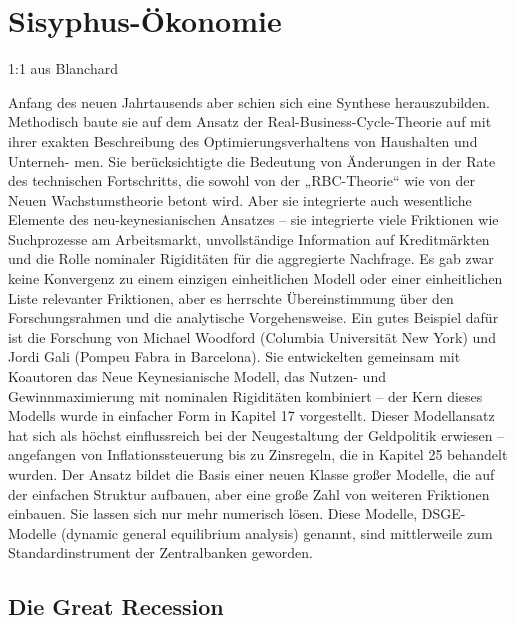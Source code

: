 %
%
%

\chapter{Sisyphus-Ökonomie}

1:1 aus Blanchard

Anfang des neuen Jahrtausends aber schien sich eine Synthese herauszubilden.
Methodisch baute sie auf dem Ansatz der Real-Business-Cycle-Theorie auf mit ihrer
exakten Beschreibung des Optimierungsverhaltens von Haushalten und Unterneh-
men. Sie berücksichtigte die Bedeutung von Änderungen in der Rate des technischen
Fortschritts, die sowohl von der „RBC-Theorie“ wie von der Neuen Wachstumstheorie
betont wird. Aber sie integrierte auch wesentliche Elemente des neu-keynesianischen
Ansatzes – sie integrierte viele Friktionen wie Suchprozesse am Arbeitsmarkt, unvollständige
Information auf Kreditmärkten und die Rolle nominaler Rigiditäten für die
aggregierte Nachfrage. Es gab zwar keine Konvergenz zu einem einzigen einheitlichen
Modell oder einer einheitlichen Liste relevanter Friktionen, aber es herrschte Übereinstimmung
über den Forschungsrahmen und die analytische Vorgehensweise.
Ein gutes Beispiel dafür ist die Forschung von Michael Woodford (Columbia Universität
New York) und Jordi Gali (Pompeu Fabra in Barcelona). Sie entwickelten gemeinsam
mit Koautoren das Neue Keynesianische Modell, das Nutzen- und Gewinnmaximierung
mit nominalen Rigiditäten kombiniert – der Kern dieses Modells wurde in
einfacher Form in Kapitel 17 vorgestellt. Dieser Modellansatz hat sich als höchst einflussreich
bei der Neugestaltung der Geldpolitik erwiesen – angefangen von Inflationssteuerung
bis zu Zinsregeln, die in Kapitel 25 behandelt wurden. Der Ansatz bildet die
Basis einer neuen Klasse großer Modelle, die auf der einfachen Struktur aufbauen, aber
eine große Zahl von weiteren Friktionen einbauen. Sie lassen sich nur mehr numerisch
lösen. Diese Modelle, DSGE-Modelle (dynamic general equilibrium analysis) genannt,
sind mittlerweile zum Standardinstrument der Zentralbanken geworden.


\section{Die Great Recession}

